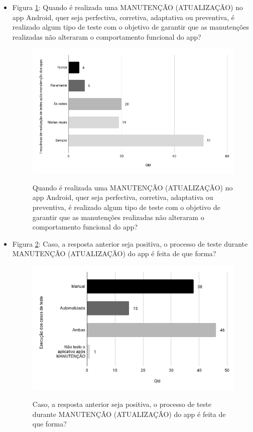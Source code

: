 \begin{itemize}
    
    \item Figura \ref{figure:s_testemanutencao}: Quando é realizada uma MANUTENÇÃO (ATUALIZAÇÃO) no app Android, quer seja perfectiva, corretiva, adaptativa ou preventiva, é realizado algum tipo de teste com o objetivo de garantir que as manutenções realizadas não alteraram o comportamento funcional do app?
    \begin{figure}[!htb]
    \centering
    \includegraphics[width=.55\textwidth]{images/s_testemanutencao.png}
    \label{figure:s_testemanutencao}
    \caption{Quando é realizada uma MANUTENÇÃO (ATUALIZAÇÃO) no app Android, quer seja perfectiva, corretiva, adaptativa ou preventiva, é realizado algum tipo de teste com o objetivo de garantir que as manutenções realizadas não alteraram o comportamento funcional do app?}
    \end{figure}   
    
    
    \item Figura \ref{figure:s_formatestemanutencao}: Caso, a resposta anterior seja positiva, o processo de teste durante MANUTENÇÃO (ATUALIZAÇÃO) do app é feita de que forma?
    \begin{figure}[!htb]
    \centering
    \includegraphics[width=.55\textwidth]{images/s_formatestemanutencao.png}
    \label{figure:s_formatestemanutencao}
    \caption{Caso, a resposta anterior seja positiva, o processo de teste durante MANUTENÇÃO (ATUALIZAÇÃO) do app é feita de que forma?}
    \end{figure}     
    

\end{itemize}

